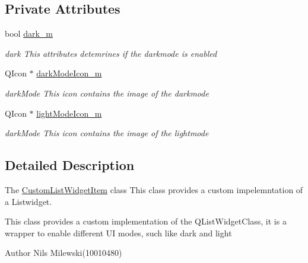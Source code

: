 \subsection*{Private Attributes}
\begin{DoxyCompactItemize}
\item 
\mbox{\label{class_custom_list_widget_item_aedc35c340aac27fc0800b73afbbbc228}} 
bool \mbox{\hyperlink{class_custom_list_widget_item_aedc35c340aac27fc0800b73afbbbc228}{dark\+\_\+m}}
\begin{DoxyCompactList}\small\item\em dark This attributes detemrines if the darkmode is enabled \end{DoxyCompactList}\item 
\mbox{\label{class_custom_list_widget_item_a458dbdecb66efab651ea77ce58198ac3}} 
Q\+Icon $\ast$ \mbox{\hyperlink{class_custom_list_widget_item_a458dbdecb66efab651ea77ce58198ac3}{dark\+Mode\+Icon\+\_\+m}}
\begin{DoxyCompactList}\small\item\em dark\+Mode This icon contains the image of the darkmode \end{DoxyCompactList}\item 
\mbox{\label{class_custom_list_widget_item_aca43758de96754af340dcdb41a440b2d}} 
Q\+Icon $\ast$ \mbox{\hyperlink{class_custom_list_widget_item_aca43758de96754af340dcdb41a440b2d}{light\+Mode\+Icon\+\_\+m}}
\begin{DoxyCompactList}\small\item\em dark\+Mode This icon contains the image of the lightmode \end{DoxyCompactList}\end{DoxyCompactItemize}


\subsection{Detailed Description}
The \mbox{\hyperlink{class_custom_list_widget_item}{Custom\+List\+Widget\+Item}} class This class provides a custom impelemntation of a Listwidget. 

This class provides a custom implementation of the Q\+List\+Widget\+Class, it is a wrapper to enable different UI modes, such like dark and light \begin{DoxyAuthor}{Author}
Nils Milewski(10010480) 
\end{DoxyAuthor}


